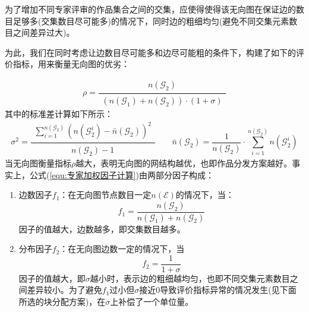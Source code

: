\documentclass[bwprint]{gmcmthesis}
\begin{document}
	为了增加不同专家评审的作品集合之间的交集，应使得使得该无向图在保证边的数目足够多(交集数目尽可能多)的情况下，同时边的粗细均匀(避免不同交集元素数目之间差异过大)。
	
	为此，我们在同时考虑让边数目尽可能多和边尽可能粗的条件下，构建了如下的评价指标，用来衡量无向图的优劣：
	
	\begin{equation}
	\label{equ:专家加权因子计算}
	\rho=\frac{
		\begin{aligned}
			n(\mathcal{G}_2)
		\end{aligned}
	}{
		\begin{aligned}
			\left( 	n(\mathcal{G}_1)+n(\mathcal{G}_2)\right) \cdot(1+\sigma)
		\end{aligned}
	}
\end{equation}
其中的标准差计算如下所示：
\begin{equation}
	\sigma^2=	\frac{
		\begin{aligned}
			\sum_{i=1}^{n(\mathcal{G}_2)}
			\left( 
			n\left(\mathcal{G}_2^i \right) -\bar{n}{(\mathcal{G}_2) }
			\right) ^2
		\end{aligned}
	}{
		\begin{aligned}
			n(\mathcal{G}_2)-1
		\end{aligned}
	}
	\qquad
	\bar{n}{(\mathcal{G}_2)}=\frac{1}{n(\mathcal{G}_2)}\cdot\sum_{i=1}^{n(\mathcal{G}_2)}n(\mathcal{G}_2^i)
\end{equation}
当无向图衡量指标$\rho$越大，表明无向图的网结构越优，也即作品分发方案越好。事实上，公式(\ref{equ:专家加权因子计算})由两部分因子构成：
\begin{enumerate}
	\item 边数因子$f_1$：在无向图节点数目一定$n(\mathcal{E})$的情况下，当：
	\begin{equation}
		f_1=\frac{n(\mathcal{G}_2)}{n(\mathcal{G}_1)+n(\mathcal{G}_2)}
	\end{equation}
	因子的值越大，边数越多，即交集数目越多。
	
	\item 分布因子$f_2$：在无向图边数一定的情况下，当
	\begin{equation}
		f_2=\frac{1}{1+\sigma}
	\end{equation}
	因子的值越大，即$\sigma$越小时，表示边的粗细越均匀，也即不同交集元素数目之间差异较小。为了避免$f_1$过小但$\sigma$接近0导致评价指标异常的情况发生(见下面所选的块分配方案)，在$\sigma$上补偿了一个单位量。
\end{enumerate}
\end{document}
